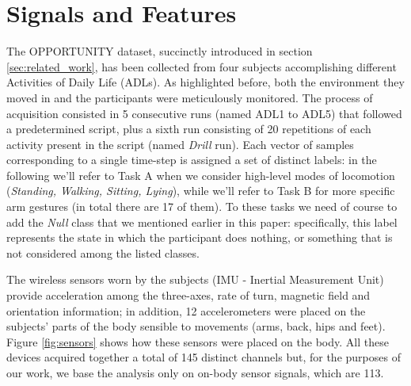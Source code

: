 \section{Signals and Features}
\label{sec:model}

The OPPORTUNITY dataset, succinctly introduced in section \ref{sec:related_work}, has been collected from four subjects accomplishing different Activities of Daily Life (ADLs). As highlighted before, both the environment they moved in and the participants were meticulously monitored.
The process of acquisition consisted in 5 consecutive runs (named ADL1 to ADL5) that followed a predetermined script, plus a sixth run consisting of 20 repetitions of each activity present in the script (named \textit{Drill} run). Each vector of samples corresponding to a single time-step is assigned a set of distinct labels: in the following we'll refer to Task A when we consider high-level modes of locomotion (\textit{Standing, Walking, Sitting, Lying}), while we'll refer to Task B for more specific arm gestures (in total there are 17 of them). To these tasks we need of course to add the \textit{Null} class that we mentioned earlier in this paper: specifically, this label represents the state in which the participant does nothing, or something that is not considered among the listed classes.

The wireless sensors worn by the subjects (IMU - Inertial Measurement Unit) provide acceleration among the three-axes, rate of turn, magnetic field and orientation information; in addition, 12 accelerometers were placed on the subjects' parts of the body sensible to movements (arms, back, hips and feet). Figure \ref{fig:sensors} shows how these sensors were placed on the body. All these devices acquired together a total of 145 distinct channels but, for the purposes of our work, we base the analysis only on on-body sensor signals, which are 113.

